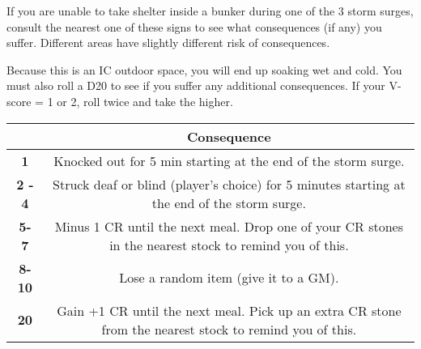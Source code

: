 \documentclass[green]{GL2020}
\begin{document}
\name{\gStormSurgeOutside{}}

If you are unable to take shelter inside a bunker during one of the 3 storm surges, consult the nearest one of these signs to see what consequences (if any) you suffer. Different areas have slightly different risk of consequences.

Because this is an IC outdoor space, you will end up soaking wet and cold. You must also roll a D20 to see if you suffer any additional consequences. If your V-score = 1 or 2, roll twice and take the higher.

\begin{tabularx}{\textwidth}{|>{\centering\arraybackslash}c | >{\centering\arraybackslash}c |}
\hline
  {\large What you Roll} & {\large Consequence}  \\
\hline
 \textbf{1} & Knocked out for 5 min starting at the end of the storm surge.  \\
\hline
  \textbf{2 - 4} & Struck deaf or blind (player’s choice) for 5 minutes starting at the end of the storm surge.  \\
\hline
  \textbf{5- 7} & Minus 1 CR until the next meal. Drop one of your CR stones in the nearest stock to remind you of this.  \\
\hline
  \textbf{8- 10} & Lose a random item (give it to a GM).  \\
\hline
 \textbf{20} & Gain +1 CR until the next meal. Pick up an extra CR stone from the nearest stock to remind you of this.  \\
\hline
\end{tabularx}
\end{document}
